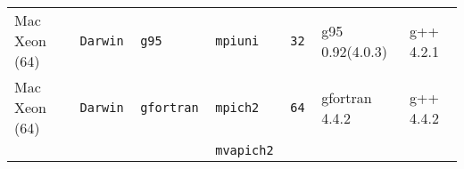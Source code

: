\begin{tabular}{lllllll}
Mac Xeon (64)         &\tt Darwin &\tt g95          &\tt mpiuni     &\tt 32              & g95 \footnotesize 0.92(4.0.3)       & g++ \footnotesize 4.2.1         \\ %
Mac Xeon (64)         &\tt Darwin &\tt gfortran     &\tt mpich2     &\tt 64              & gfortran \footnotesize 4.4.2       & g++ \footnotesize 4.4.2         \\ %
                      &           &                 &\tt mvapich2   &                    &                                    &                                 \\

\end{tabular}
